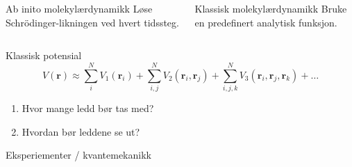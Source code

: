 \documentclass{beamer}
\begin{document}
\begin{frame}

\begin{columns}[T] %
  \begin{column}[T]{0.5\linewidth} %
    \begin{block}{Ab inito molekylærdynamikk}
    Løse Schrödinger-likningen ved hvert tidssteg.
    \end{block}
  \end{column}
  \begin{column}[T]{0.5\linewidth} %
    \begin{block}{Klassisk molekylærdynamikk}
    Bruke en predefinert analytisk funksjon.
    \end{block}
  \end{column}
\end{columns}

\end{frame}


\begin{frame}

\begin{block}{Klassisk potensial}
  \begin{equation*}
  V(\mathbf{r}) \approx \sum_i^N V_1(\mathbf{r}_i) + \sum_{i,j}^N V_2(\mathbf{r}_i, \mathbf{r}_j) + 
  \sum_{i,j,k}^N V_3(\mathbf{r}_i, \mathbf{r}_j, \mathbf{r}_k) + \dots
  \end{equation*}
\end{block}

\begin{enumerate}
 \item Hvor mange ledd bør tas med?
 \item Hvordan bør leddene se ut?
\end{enumerate}

Eksperiementer / kvantemekanikk

\end{frame}
\end{document}
